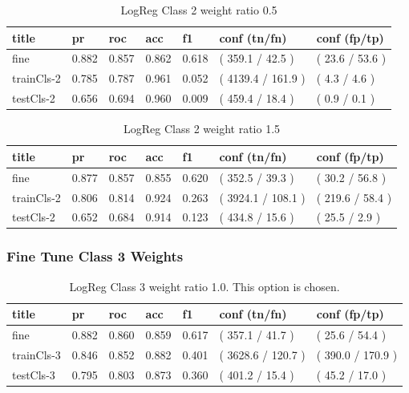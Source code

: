 \documentclass[ms]{nuthesis}
\begin{document}
\FloatBarrier
\begin{table}[H]
\centering
\begin{tabular}{|l||l||l||l||l||l||l|}\toprule
title & pr & roc & acc & f1 & conf (tn/fn) & conf (fp/tp) \\ \midrule
fine & 0.882 & 0.857 & 0.862 & 0.618 & ( 359.1 / 42.5 ) & ( 23.6 / 53.6 ) \\
trainCls-2 & 0.785 & 0.787 & 0.961 & 0.052 & ( 4139.4 / 161.9 ) & ( 4.3 / 4.6 ) \\
testCls-2 & 0.656 & 0.694 & 0.960 & 0.009 & ( 459.4 / 18.4 ) & ( 0.9 / 0.1 ) \\ \bottomrule
\end{tabular}
\caption{LogReg Class 2 weight ratio 0.5}
\label{tab:LogRegCls2-Wtp5}
\end{table}
\FloatBarrier

\FloatBarrier
\begin{table}[H]
\centering
\begin{tabular}{|l||l||l||l||l||l||l|}\toprule
title & pr & roc & acc & f1 & conf (tn/fn) & conf (fp/tp) \\ \midrule
fine & 0.877 & 0.857 & 0.855 & 0.620 & ( 352.5 / 39.3 ) & ( 30.2 / 56.8 ) \\
trainCls-2 & 0.806 & 0.814 & 0.924 & 0.263 & ( 3924.1 / 108.1 ) & ( 219.6 / 58.4 ) \\
testCls-2 & 0.652 & 0.684 & 0.914 & 0.123 & ( 434.8 / 15.6 ) & ( 25.5 / 2.9 ) \\ \bottomrule
\end{tabular}
\caption{LogReg Class 2 weight ratio 1.5}
\label{tab:LogRegCls2-Wt1p5}
\end{table}
\FloatBarrier


\subsubsection{Fine Tune Class 3 Weights}
\FloatBarrier
\begin{table}[H]
\centering
\begin{tabular}{|l||l||l||l||l||l||l|}\toprule
title & pr & roc & acc & f1 & conf (tn/fn) & conf (fp/tp) \\ \midrule
fine & 0.882 & 0.860 & 0.859 & 0.617 & ( 357.1 / 41.7 ) & ( 25.6 / 54.4 ) \\
trainCls-3 & 0.846 & 0.852 & 0.882 & 0.401 & ( 3628.6 / 120.7 ) & ( 390.0 / 170.9 ) \\
testCls-3 & 0.795 & 0.803 & 0.873 & 0.360 & ( 401.2 / 15.4 ) & ( 45.2 / 17.0 ) \\ \bottomrule
\end{tabular}
\caption{LogReg Class 3 weight ratio 1.0. This option is chosen.}
\label{tab:LogRegCls3-Wt1}
\end{table}
\FloatBarrier
\end{document}
